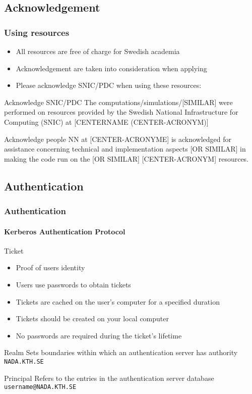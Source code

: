 \subsection*{Acknowledgement }
\frame
{
\frametitle{Using resources}

\begin{itemize}
\item All resources are free of charge for Swedish academia
\item Acknowledgement \alert{are} taken into consideration when applying
\item Please acknowledge SNIC/PDC when using these resources:
\end{itemize}
\begin{alertblock}{Acknowledge SNIC/PDC}
The computations/simulations/[SIMILAR] were performed on resources provided by the Swedish National Infrastructure for Computing (SNIC) at [CENTERNAME (CENTER-ACRONYM)]
\end{alertblock}
\begin{alertblock}{Acknowledge people}
NN at [CENTER-ACRONYME] is acknowledged for assistance concerning technical and implementation aspects [OR SIMILAR] in making the code run on the [OR SIMILAR] [CENTER-ACRONYM] resources.
\end{alertblock}
}



\subsection{Authentication}
\begin{frame}[fragile]
\frametitle{Authentication}
\framesubtitle{\alert{\textbf{Kerberos}} Authentication Protocol}
\footnotesize
\begin{exampleblock}{\large{Ticket}}
\begin{itemize}
  \item Proof of users identity
  \item Users use passwords to obtain tickets
  \item Tickets are cached on the user's computer for a specified duration
  \item Tickets \alert{should be created on your local computer}
  \item No passwords are required during the ticket's lifetime
\end{itemize}
\end{exampleblock}

\begin{exampleblock}{\large{Realm}}
Sets boundaries within which an authentication server has authority \verb|NADA.KTH.SE|
\end{exampleblock}

\begin{exampleblock}{\large{Principal}}
Refers to the entries in the authentication server database  \verb|username@NADA.KTH.SE|
\end{exampleblock}

\end{frame}

